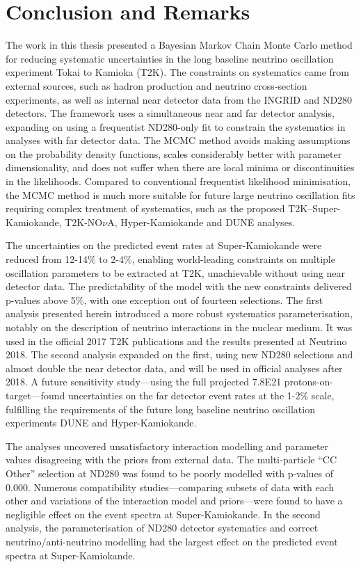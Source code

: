 \chapter{Conclusion and Remarks}
\label{chap:conclusion}
The work in this thesis presented a Bayesian Markov Chain Monte Carlo method for reducing systematic uncertainties in the long baseline neutrino oscillation experiment Tokai to Kamioka (T2K). The constraints on systematics came from external sources, such as hadron production and neutrino cross-section experiments, as well as internal near detector data from the INGRID and ND280 detectors. The framework uses a simultaneous near and far detector analysis, expanding on using a frequentist ND280-only fit to constrain the systematics in analyses with far detector data. The MCMC method avoids making assumptions on the probability density functions, scales considerably better with parameter dimensionality, and does not suffer when there are local minima or discontinuities in the likelihoods. Compared to conventional frequentist likelihood minimisation, the MCMC method is much more suitable for future large neutrino oscillation fits requiring complex treatment of systematics, such as the proposed T2K--Super-Kamiokande, T2K-NO$\nu$A, Hyper-Kamiokande and DUNE analyses.

The uncertainties on the predicted event rates at Super-Kamiokande were reduced from 12-14\% to 2-4\%, enabling world-leading constraints on multiple oscillation parameters to be extracted at T2K, unachievable without using near detector data. The predictability of the model with the new constraints delivered p-values above 5\%, with one exception out of fourteen selections. The first analysis presented herein introduced a more robust systematics parameterisation, notably on the description of neutrino interactions in the nuclear medium. It was used in the official 2017 T2K publications and the results presented at Neutrino 2018. The second analysis expanded on the first, using new ND280 selections and almost double the near detector data, and will be used in official analyses after 2018. A future sensitivity study---using the full projected 7.8E21 protons-on-target---found uncertainties on the far detector event rates at the 1-2\% scale, fulfilling the requirements of the future long baseline neutrino oscillation experiments DUNE and Hyper-Kamiokande.

The analyses uncovered unsatisfactory interaction modelling and parameter values disagreeing with the priors from external data. The multi-particle ``CC Other'' selection at ND280 was found to be poorly modelled with p-values of 0.000. Numerous compatibility studies---comparing subsets of data with each other and variations of the interaction model and priors---were found to have a negligible effect on the event spectra at Super-Kamiokande. In the second analysis, the parameterisation of ND280 detector systematics and correct neutrino/anti-neutrino modelling had the largest effect on the predicted event spectra at Super-Kamiokande.

